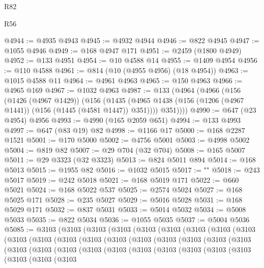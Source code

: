 \begin{lexlean}{R82}
\begin{lexlean}{R56}
\begin{coremodule}
{{{{{{{{{{{{{{{{{{{{{{{{{{{{{{{{{{{{{{{{{{{{{{{{{{{{{{{{{{{{{{{{{{{{{{{{{{{{{{{{{{{{{{{{{{{{{{{{{{{{{{{{{{{{{{{{{{{{{{{{{{{{{{{{{{{{{{{{{{{{{{{{{{{{{{{{{{{{{{{{{{{{{{{{{{{{{{{{{{{{{{{{{{{{{{{{{{{{{{{{{{{{{{{{{{{@4944 := @4935 @4943
@4945 := @4932 @4944
@4946 := @822 @4945
@4947 := @1055 @4946
@4949 := @168 @4947 @171
@4951 := @2459 (@1800 @4949)
@4952 := @133 @4951
@4954 := @10 @4588 @14
@4955 := @1409 @4954
@4956 := @110 @4588
@4961 := @814 (@10 (@4955 @4956) (@18 @4954))
@4963 := @1015 @4588 @11
@4964 := @4961 @4963
@4965 := @150 @4963
@4966 := @4965 @169
@4967 := @1032 @4963
@4987 := @133
    (@4964
      (@4966
        (@156
          (@1426 (@4967 @1429))
          (@156
            (@1435 (@4965 @1438 (@156 (@1206 (@4967 @1441)) (@156 (@1445 (@4581 @1447)) @351))))
            @351))))
@4990 := @647 (@23 @4954) @4956
@4993 := @4990 (@165 @2059 @651)
@4994 := @133 @4993
@4997 := @647 (@83 @19) @82
@4998 := @1166 @17
@5000 := @168 @2287 @1521
@5001 := @170 @5000
@5002 := @4756 @5001
@5003 := @4998 @5002
@5004 := @819 @82
@5007 := @29 @704 (@32 @704)
@5008 := @165 @5007
@5011 := @29 @3323 (@32 @3323)
@5013 := @824 @5011 @894
@5014 := @168 @5013
@5015 := @1955 @82
@5016 := @1032 @5015
@5017 := "\n"
@5018 := @243 @5017
@5019 := @242 @5018
@5021 := @168 @5019 @171
@5022 := @660 @5021
@5024 := @168 @5022 @537
@5025 := @2574 @5024
@5027 := @168 @5025 @171
@5028 := @235 @5027
@5029 := @5016 @5028
@5031 := @168 @5029 @171
@5032 := @837 @5031
@5033 := @5014 @5032
@5034 := @5008 @5033
@5035 := @822 @5034
@5036 := @1055 @5035
@5037 := @5004 @5036
@5085 := @3103
    (@3103
      (@3103
        (@3103
          (@3103
            (@3103
              (@3103
                (@3103
                  (@3103
                    (@3103
                      (@3103
                        (@3103
                          (@3103
                            (@3103
                              (@3103
                                (@3103
                                  (@3103
                                    (@3103
                                      (@3103
                                        (@3103
                                          (@3103
                                            (@3103
                                              (@3103
                                                (@3103
                                                  (@3103
                                                    (@3103
                                                      (@3103
                                                        (@3103
                                                          (@3103
                                                            (@3103
                                                              (@3103
                                                                (@3103
}}}}}}}}}}}}}}}}}}}}}}}}}}}}}}}}}}}}}}}}}}}}}}}}}}}}}}}}}}}}}}}}}}}}}}}}}}}}}}}}}}}}}}}}}}}}}}}}}}}}}}}}}}}}}}}}}}}}}}}}}}}}}}}}}}}}}}}}}}}}}}}}}}}}}}}}}}}}}}}}}}}}}}}}}}}}}}}}}}}}}}}}}}}}}}}}}}}}}}}}}}}}}}}}}}}
\end{coremodule}
\end{lexlean}
\end{lexlean}
